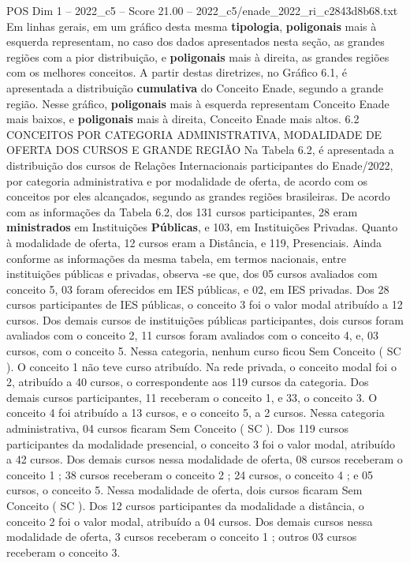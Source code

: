 \begin{textsample}{POS Dim 1 – 2022\_c5 – Score 21.00 – 2022\_c5/enade\_2022\_ri\_c2843d8b68.txt}
Em linhas gerais, em um gráfico desta mesma \textbf{tipologia}, \textbf{poligonais} mais à esquerda representam, no caso dos dados apresentados nesta seção, as grandes regiões com a pior distribuição, e \textbf{poligonais} mais à direita, as grandes regiões com os melhores conceitos.
A partir destas diretrizes, no Gráfico 6.1, é apresentada a distribuição \textbf{cumulativa} do Conceito Enade, segundo a grande região.
Nesse gráfico, \textbf{poligonais} mais à esquerda representam Conceito Enade mais baixos, e \textbf{poligonais} mais à direita, Conceito Enade mais altos. 6.2 CONCEITOS POR CATEGORIA ADMINISTRATIVA, MODALIDADE DE OFERTA DOS CURSOS E GRANDE REGIÃO Na Tabela 6.2, é apresentada a distribuição dos cursos de Relações Internacionais participantes do Enade/2022, por categoria administrativa e por modalidade de oferta, de acordo com os conceitos por eles alcançados, segundo as grandes regiões brasileiras.
De acordo com as informações da Tabela 6.2, dos 131 cursos participantes, 28 eram \textbf{ministrados} em Instituições \textbf{Públicas}, e 103, em Instituições Privadas.
Quanto à modalidade de oferta, 12 cursos eram a Distância, e 119, Presenciais.
Ainda conforme as informações da mesma tabela, em termos nacionais, entre instituições públicas e privadas, observa -se que, dos 05 cursos avaliados com conceito 5, 03 foram oferecidos em IES públicas, e 02, em IES privadas.
Dos 28 cursos participantes de IES públicas, o conceito 3 foi o valor modal atribuído a 12 cursos.
Dos demais cursos de instituições públicas participantes, dois cursos foram avaliados com o conceito 2, 11 cursos foram avaliados com o conceito 4, e, 03 cursos, com o conceito 5.
Nessa categoria, nenhum curso ficou Sem Conceito ( SC ).
O conceito 1 não teve curso atribuído.
Na rede privada, o conceito modal foi o 2, atribuído a 40 cursos, o correspondente aos 119 cursos da categoria.
Dos demais cursos participantes, 11 receberam o conceito 1, e 33, o conceito 3.
O conceito 4 foi atribuído a 13 cursos, e o conceito 5, a 2 cursos.
Nessa categoria administrativa, 04 cursos ficaram Sem Conceito ( SC ).
Dos 119 cursos participantes da modalidade presencial, o conceito 3 foi o valor modal, atribuído a 42 cursos.
Dos demais cursos nessa modalidade de oferta, 08 cursos receberam o conceito 1 ; 38 cursos receberam o conceito 2 ; 24 cursos, o conceito 4 ; e 05 cursos, o conceito 5.
Nessa modalidade de oferta, dois cursos ficaram Sem Conceito ( SC ).
Dos 12 cursos participantes da modalidade a distância, o conceito 2 foi o valor modal, atribuído a 04 cursos.
Dos demais cursos nessa modalidade de oferta, 3 cursos receberam o conceito 1 ; outros 03 cursos receberam o conceito 3.

\end{textsample}
